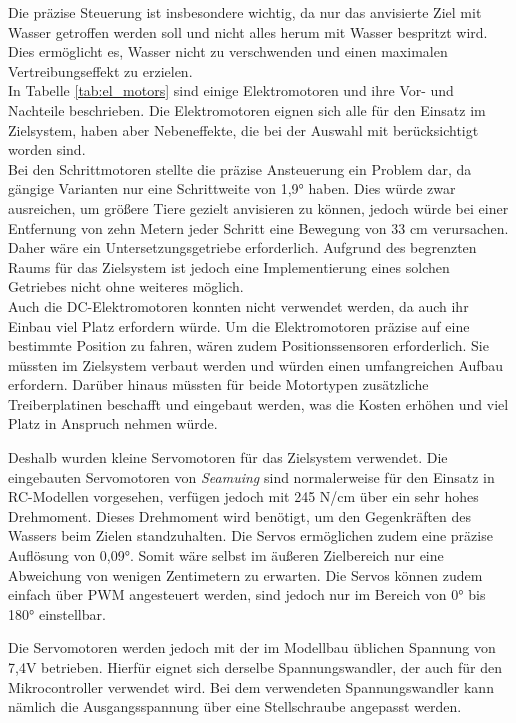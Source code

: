 Die präzise Steuerung ist insbesondere wichtig, da nur das anvisierte Ziel mit Wasser getroffen werden soll und nicht alles herum mit Wasser bespritzt wird. Dies ermöglicht es, Wasser nicht zu verschwenden und einen maximalen Vertreibungseffekt zu erzielen.
\\
In Tabelle \ref{tab:el_motors} sind einige Elektromotoren und ihre Vor- und Nachteile beschrieben. Die Elektromotoren eignen sich alle für den Einsatz im Zielsystem, haben aber Nebeneffekte, die bei der Auswahl mit berücksichtigt worden sind.
\\
Bei den Schrittmotoren stellte die präzise Ansteuerung ein Problem dar, da gängige Varianten nur eine Schrittweite von 1,9° haben. Dies würde zwar ausreichen, um größere Tiere gezielt anvisieren zu können, jedoch würde bei einer Entfernung von zehn Metern jeder Schritt eine Bewegung von 33 cm verursachen. Daher wäre ein Untersetzungsgetriebe erforderlich. Aufgrund des begrenzten Raums für das Zielsystem ist jedoch eine Implementierung eines solchen Getriebes nicht ohne weiteres möglich.
\\
Auch die DC-Elektromotoren konnten nicht verwendet werden, da auch ihr Einbau viel Platz erfordern würde. Um die Elektromotoren präzise auf eine bestimmte Position zu fahren, wären zudem Positionssensoren erforderlich. Sie müssten im Zielsystem verbaut werden und würden einen umfangreichen Aufbau erfordern. Darüber hinaus müssten für beide Motortypen zusätzliche Treiberplatinen beschafft und eingebaut werden, was die Kosten erhöhen und viel Platz in Anspruch nehmen würde.

Deshalb wurden kleine Servomotoren für das Zielsystem verwendet. Die eingebauten Servomotoren von \textit{Seamuing} sind normalerweise für den Einsatz in RC-Modellen vorgesehen, verfügen jedoch mit 245 N/cm über ein sehr hohes Drehmoment. Dieses Drehmoment wird benötigt, um den Gegenkräften des Wassers beim Zielen standzuhalten. Die Servos ermöglichen zudem eine präzise Auflösung von 0,09°. Somit wäre selbst im äußeren Zielbereich nur eine Abweichung von wenigen Zentimetern zu erwarten. Die Servos können zudem einfach über \ac{PWM} angesteuert werden, sind jedoch nur im Bereich von 0° bis 180° einstellbar. \cite{am_servos}

Die Servomotoren werden jedoch mit der im Modellbau üblichen Spannung von 7,4V betrieben. Hierfür eignet sich derselbe Spannungswandler, der auch für den Mikrocontroller verwendet wird. Bei dem verwendeten Spannungswandler kann nämlich die Ausgangsspannung über eine Stellschraube angepasst werden.

